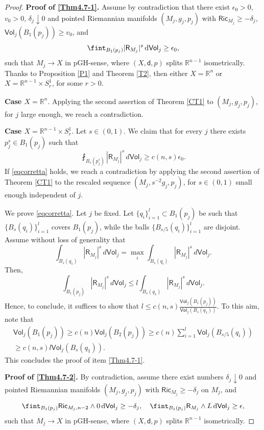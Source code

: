 \documentclass[10pt]{article}
\theoremstyle{definition}
\newcommand{\bb}[1]{\mathbb{#1}}
\newcommand{\ssf}[1]{\mathsf{#1}}
\newcommand{\Ric}{\mathsf{Ric}}
\newcommand{\sd}{\mathsf{d}}
\newcommand{\R}{\mathsf{R}}
\newcommand{\de}{{\rm d}}
\begin{document}
\begin{proof} 
\textbf{Proof of \ref{Thm4.7-1}.}
Assume by contradiction that there exist $\epsilon_0>0$, $v_0>0$, $\delta_j \downarrow 0$ and pointed Riemannian manifolds $(M_j,g_j,p_j)$ with $\Ric_{M_j} \geq -\delta_j$, $\ssf{Vol}_j(B_1(p_j)) \geq v_0$, and
\[
\fint_{B_1(p_j)}|\R_{M_j}|^s \, \de \ssf{Vol}_j \geq \epsilon_0,
\]
such that
$M_j \to X$ in  pGH-sense, where $(X,\sd,p)$ splits $\bb{R}^{n-1}$ isometrically.
Thanks to Proposition \ref{P1} and Theorem \ref{T2}, then either $X=\bb{R}^n$ or $X=\bb{R}^{n-1} \times S^1_r$, for some $r>0$. 
\smallskip

\textbf{Case $X=\bb{R}^n$}.
Applying the second assertion of Theorem \ref{CT1} to $(M_j, g_j, p_j)$, for $j$ large enough, we reach a contradiction.

\smallskip
\textbf{Case $X=\bb{R}^{n-1} \times S^1_r$}.  
Let $s \in (0,1)$. We claim that for every $j$ there exists $p_j^s \in B_1(p_j)$ such that
\begin{equation} \label{eqcorretta}
\fint_{B_s(p_j^s)} |\R_{M_j}|^s \, d\ssf{Vol}_j \geq c(n,s)\epsilon_0.
\end{equation}
If \eqref{eqcorretta} holds, we reach a contradiction by applying the second assertion of Theorem \ref{CT1} to the rescaled sequence $(M_j, s^{-2} g_j, p_j)$, for $s \in (0,1)$ small enough independent of $j$.

We prove \eqref{eqcorretta}. Let $j$ be fixed. Let $\{q_i\}_{i=1}^l \subset B_1(p_j)$ be such that $\{B_s(q_i)\}_{i=1}^l$ covers $B_1(p_j)$, while the balls $\{B_{s/5}(q_i)\}_{i=1}^l$ are disjoint. Assume without loss of generality that
\[
\int_{B_s(q_1)}|\R_{M_j}|^s \, d\ssf{Vol}_j=\max_{i}\int_{B_s(q_i)}|\R_{M_j}|^s \, d\ssf{Vol}_j.
\]
Then,
\[
\int_{B_1(p_j)}|\R_{M_j}|^s \, d\ssf{Vol}_j \leq l \int_{B_s(q_1)}|\R_{M_j}|^s \, d\ssf{Vol}_j.
\]
Hence, to conclude, it suffices to show that $l \leq c(n,s)\frac{\ssf{Vol}_j(B_1(p_j))}{\ssf{Vol}_j(B_s(q_1))}$.
To this aim, note that
\begin{align*}
\ssf{Vol}_j(B_1(p_j))  \geq c(n)\ssf{Vol}_j(B_2(p_j)) \geq c(n)\sum_{i=1}^l \ssf{Vol}_j(B_{s/5}(q_i)) \\
 \geq c(n,s)l\ssf{Vol}_j(B_s(q_1)).
\end{align*}
This concludes the proof of item \ref{Thm4.7-1}.
\smallskip

\textbf{Proof of \ref{Thm4.7-2}.}
By contradiction, assume there exist numbers $\delta_j \downarrow 0$ and pointed Riemannian manifolds $(M_j,g_j,p_j)$ with $\Ric_{M_j} \geq -\delta_j$ on $M_j$, and
\begin{equation} \label{E4}
\fint_{B_1(p_j)} \ssf{Ric}_{M_j,n-2} \wedge 0 \, \de \ssf{Vol}_j  \geq -\delta_j, \quad 
\fint_{B_1(p_j)}\R_{M_j} \wedge L \, \de \ssf{Vol}_j \geq \epsilon,
\end{equation}
such that
$M_j \to X$ in pGH-sense, where $(X,\sd,p)$ splits $\bb{R}^{n-1}$ isometrically. 


\end{proof}
\end{document}

